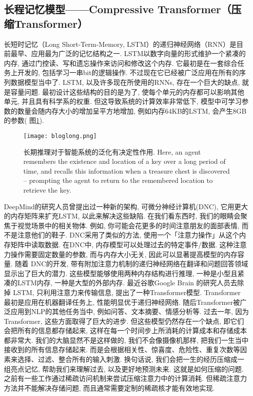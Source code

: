 \subsection{长程记忆模型——Compressive Transformer（压缩Transformer）}
长短时记忆（Long Short-Term-Memory, LSTM）的递归神经网络（RNN）是目前最早、应用最为广泛的记忆结构之一. LSTM以数字向量的形式维护一个紧凑的内存, 通过门控读、写和遗忘操作来访问和修改这个内存. 它最初是在一套综合任务上开发的, 包括学习一串bit的逻辑操作. 不过现在它已经被广泛应用在所有的序列数据模型当中了.
LSTM, 以及许多现在所使用的RNNs, 存在一个巨大的缺点, 就是容量问题. 最初设计这些结构的目的是为了, 使每个单元的内存都可以影响其他单元, 并且具有科学系的权重. 但这导致系统的计算效率非常低下, 模型中可学习参数的数量会随内存大小的增加呈平方地增加, 例如内存64KB的LSTM, 会产生8GB的参数( 图\ref{bloglong}).
\begin{figure}[H]
\centering
\texttt{[image: bloglong.png]}
\caption{长期推理对于智能系统的泛化有决定性作用. Here, an agent remembers the existence and location of a key over a long period of time, and recalls this information when a treasure chest is discovered – prompting the agent to return to the remembered location to retrieve the key.}
\label{bloglong}
\vspace{-0.4cm}
\end{figure}

DeepMind的研究人员曾提出过一种新的架构, 可微分神经计算机(DNC), 它用更大的内存矩阵来扩充LSTM, 以此来解决这些缺陷.
在我们看东西时, 我们的眼睛会聚焦于视觉场景中的相关物体. 例如, 你可能会花更多的时间注意朋友的面部表情, 而不是注意他们的鞋子.
DNC采用了类似的方法, 使用一个「注意力操作」从这个内存矩阵中读取数据.
在DNC中, 内存模型可以处理过去的特定事件/数据. 这种注意力操作需要固定数量的参数, 而与内存大小无关, 因此可以显著提高模型的内存容量.
随着 DNC的开发, 带有附加注意力机制的递归神经网络在翻译和问题回答领域显示出了巨大的潜力. 这些模型能够使用两种内存结构进行推理, 一种是小型且紧凑的LSTM内存, 一种是大型的外部内存.
最近谷歌Google Brain 的研究人员去除掉 LSTM, 只利用注意力来传输信息, 提出了一种Transformer模型.
Transformer 最初是应用在机器翻译任务上, 性能明显优于递归神经网络.
随后Transformer被广泛应用到NLP的其他任务当中, 例如问答、文本摘要、情感分析等. 过去一年, 因为Transformer, 这些方面取得了巨大的进步.
但这些模型仍然存在一个缺点, 即它们会把所有的信息都存储起来, 这样在每一个时间步上所消耗的计算成本和存储成本都非常大.
我们的大脑显然不是这样做的, 我们不会像摄像机那样, 把我们一生当中接收到的所有信息存储起来. 而是会根据相关性、惊喜度、危险性、重复次数等因素来选择、过滤、整合所有的输入刺激. 换句话说, 我们会把一生的经历压缩成一组亮点记忆, 帮助我们来理解过去, 以及更好地预测未来.
这就是如何压缩的问题.
之前有一些工作通过稀疏访问机制来尝试压缩注意力中的计算消耗. 但稀疏注意力方法并不能解决存储问题, 而且通常需要定制的稀疏核才能有效地实现.

